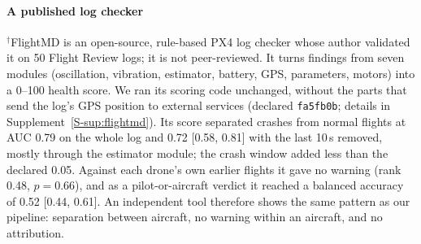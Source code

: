\documentclass[preprint,12pt]{elsarticle}
\begin{document}
\paragraph{A published log checker}
\label{sec:flightmd}
$^\dagger$FlightMD \cite{flightmd2026} is an open-source, rule-based PX4 log checker whose author validated it on 50 Flight Review logs; it is not peer-reviewed. It turns findings from seven modules (oscillation, vibration, estimator, battery, GPS, parameters, motors) into a 0--100 health score. We ran its scoring code unchanged, without the parts that send the log's GPS position to external services (declared \texttt{fa5fb0b}; details in Supplement~\ref{S-sup:flightmd}). Its score separated crashes from normal flights at AUC 0.79 on the whole log and 0.72 [0.58, 0.81] with the last 10\,s removed, mostly through the estimator module; the crash window added less than the declared 0.05. Against each drone's own earlier flights it gave no warning (rank 0.48, $p=0.66$), and as a pilot-or-aircraft verdict it reached a balanced accuracy of 0.52 [0.44, 0.61]. An independent tool therefore shows the same pattern as our pipeline: separation between aircraft, no warning within an aircraft, and no attribution.
\end{document}
